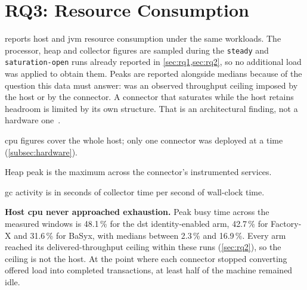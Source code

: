 \section{RQ3: Resource Consumption}\label{sec:rq3}


 reports host and \gls{jvm} resource consumption under the same workloads. The processor, heap and collector figures are sampled during the \texttt{steady} and \texttt{saturation-open} runs already reported in \cref{sec:rq1,sec:rq2}, so no additional load was applied to obtain them. Peaks are reported alongside medians because of the question this data must answer: was an observed throughput ceiling imposed by the host or by the connector. A connector that saturates while the host retains headroom is limited by its own structure. That is an architectural finding, not a hardware one~\citep{gregg2012thinking}.

\begin{table}[H]
    \centering
    \begin{threeparttable}
    \small
    \setlength{\tabcolsep}{2pt}
    
    \begin{tablenotes}[flushleft]\footnotesize
        \item \Gls{cpu} figures cover the whole host; only one connector was deployed at a time (\cref{subsec:hardware}).
        \item Heap peak is the maximum across the connector's instrumented services.
        \item \Gls{gc} activity is in seconds of collector time per second of wall-clock time.
    \end{tablenotes}
    \end{threeparttable}
    \caption[Host and JVM resource consumption]{Host and \gls{jvm} resource consumption under identical workloads, by connector and identity goal.}
    \label{tab:rq3-resources}
\end{table}

\textbf{Host \gls{cpu} never approached exhaustion.} Peak busy time across the measured windows is 48.1\,\% for the \gls{dst} identity-enabled arm, 42.7\,\% for Factory-X and 31.6\,\% for BaSyx, with medians between 2.3\,\% and 16.9\,\%. Every arm reached its delivered-throughput ceiling within these runs (\cref{sec:rq2}), so the ceiling is not the host. At the point where each connector stopped converting offered load into completed transactions, at least half of the machine remained idle.

